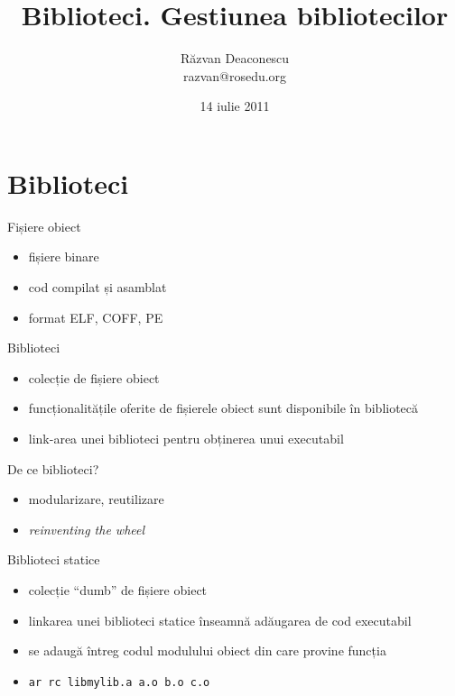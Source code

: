 \documentclass{beamer}
\title[Biblioteci]{Biblioteci. Gestiunea bibliotecilor}
\institute{Întâlnirile lunare RLUG -- Iulie 2011}
\author[Răzvan Deaconescu]{Răzvan Deaconescu \\
    razvan@rosedu.org}
\date{14 iulie 2011}
\begin{document}
\frame{\titlepage}

\section{Biblioteci}

\begin{frame}{Fișiere obiect}
  \begin{itemize}
    \item fișiere binare
    \item cod compilat și asamblat
    \item format ELF, COFF, PE
  \end{itemize}
\end{frame}

\begin{frame}{Biblioteci}
  \begin{itemize}
    \item colecție de fișiere obiect
    \item funcționalitățile oferite de fișierele obiect sunt disponibile în
    bibliotecă
    \item link-area unei biblioteci pentru obținerea unui executabil
  \end{itemize}
\end{frame}

\begin{frame}{De ce biblioteci?}
  \begin{itemize}
    \item modularizare, reutilizare
    \item \textit{reinventing the wheel}
  \end{itemize}
\end{frame}

\begin{frame}{Biblioteci statice}
  \begin{itemize}
    \item colecție ``dumb'' de fișiere obiect
    \item linkarea unei biblioteci statice înseamnă adăugarea de cod
    executabil
    \item se adaugă întreg codul modulului obiect din care provine funcția
    \item \texttt{ar rc libmylib.a a.o b.o c.o}
  \end{itemize}
\end{frame}
\end{document}
